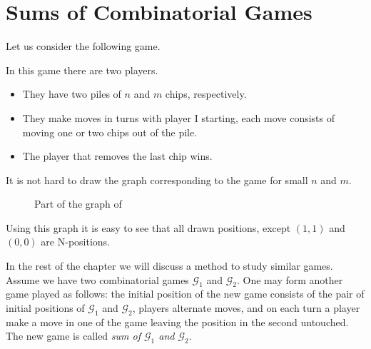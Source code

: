 \chapter{Sums of Combinatorial Games}

Let us consider the following game.
\begin{game}
\label{game:two-pile-take-away-n-m-2-1}
  In this game there are two players.
  \begin{itemize}
    \item They have two piles of $n$ and $m$ chips, respectively.
    \item They make moves in turns with player I starting,
      each move consists of moving one or two chips out of the pile.
    \item The player that removes the last chip wins.
  \end{itemize}
\end{game}
It is not hard to draw the graph corresponding to the game for small $n$ and
$m$.
\begin{figure}
  \centering
  \caption{Part of the graph of }
\end{figure}
Using this graph it is easy to see that all drawn positions, except $(1, 1)$ and
$(0, 0)$ are N-positions.

In the rest of the chapter we will discuss a method to study similar games.
Assume we have two combinatorial games $\mathcal{G}_1$ and $\mathcal{G}_2$.
One may form another game played as follows: the initial position of the new game
consists of the pair of initial positions of $\mathcal{G}_1$ and $\mathcal{G}_2$,
players alternate moves, and on each turn a player make a move in one of the game
leaving the position in the second untouched.  The new game is called
\emph{sum of $\mathcal{G}_1$ and $\mathcal{G}_2$}.

